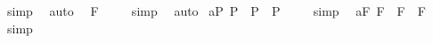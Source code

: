 \begin{isabellebody}
\ simp\ \isamarkupfalse%
\ auto%
\endisatagproof
{\isafoldproof}%
%
\isadelimproof
%
\endisadelimproof
\isanewline
{}\isamarkupfalse%
\ {\isachardoublequoteopen}{\isacharbrackleft}{\isacharparenleft}\isactrlbold {\isasymexists}{\isasymphi}{\isachardot}\ {\isacharparenleft}{\isasymphi}\isactrlsup F{\isacharparenright}{\isacharparenright}{\isacharbrackright}\ {\isacharequal}\ {\isasymtop}{\isachardoublequoteclose}%
\isadelimproof
\ %
\endisadelimproof
%
\isatagproof
{}\isamarkupfalse%
\ simp\ \isamarkupfalse%
\ auto%
\endisatagproof
{\isafoldproof}%
%
\isadelimproof
%
\endisadelimproof
%
\isamarkuptrue%
%
\isamarkuptrue%
\isamarkupfalse%
\ a{}{}{\isacharunderscore}{}{\isacharunderscore}P{\isacharcolon}\ {\isachardoublequoteopen}{\isacharbrackleft}{\isacharparenleft}{\isasymphi}\isactrlsup P{\isacharparenright}\ \isactrlbold {\isasymrightarrow}\ {\isacharparenleft}{\isacharparenleft}{\isasymphi}\isactrlsup P{\isacharparenright}\ \isactrlbold {\isasymrightarrow}\ {\isacharparenleft}{\isasymphi}\isactrlsup P{\isacharparenright}{\isacharparenright}{\isacharbrackright}\ {\isacharequal}\ {\isasymtop}{\isachardoublequoteclose}%
\isadelimproof
\ %
\endisadelimproof
%
\isatagproof
{}\isamarkupfalse%
\ simp\ \isamarkupfalse%
%
\endisatagproof
{\isafoldproof}%
%
\isadelimproof
%
\endisadelimproof
\isanewline
{}\isamarkupfalse%
\ a{}{}{\isacharunderscore}{}{\isacharunderscore}F{\isacharcolon}\ {\isachardoublequoteopen}{\isacharbrackleft}{\isacharparenleft}{\isasymphi}\isactrlsup F{\isacharparenright}\ \isactrlbold {\isasymrightarrow}\ {\isacharparenleft}{\isacharparenleft}{\isasymphi}\isactrlsup F{\isacharparenright}\ \isactrlbold {\isasymrightarrow}\ {\isacharparenleft}{\isasymphi}\isactrlsup F{\isacharparenright}{\isacharparenright}{\isacharbrackright}\ {\isacharequal}\ {\isasymtop}{\isachardoublequoteclose}%
\isadelimproof
\ %
\endisadelimproof
%
\isatagproof
{}\isamarkupfalse%
\ simp\ \isamarkupfalse%
%
\endisatagproof
{\isafoldproof}%
%
\isadelimproof
%
\endisadelimproof
\isanewline
{}\isamarkupfalse%

\end{isabellebody}
